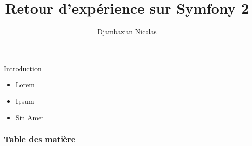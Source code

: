 \documentclass[8pt, francais]{beamer}
\title{Retour d'expérience sur Symfony 2}
\date{}
\author{Djambazian Nicolas}
\begin{document}
\frame{\titlepage}

\begin{frame}{Introduction}
	\begin{block}{}
		\begin{itemize}
			\item Lorem
			\item Ipsum
			\item Sin Amet
		\end{itemize}
	\end{block}
\end{frame}


\begin{frame}
	\frametitle{Table des matière}
	\tableofcontents
\end{frame}
\end{document}
